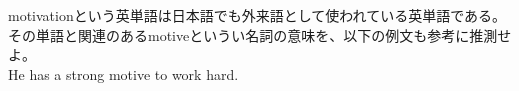 \documentclass{jarticle}
\begin{document}
\vspace*{\fill}
\begin{center}
motivationという英単語は日本語でも外来語として使われている英単語である。\\
その単語と関連のあるmotiveというい名詞の意味を、以下の例文も参考に推測せよ。\\
He has a strong motive to work hard.
\end{center}
\vspace*{\fill}
\end{document}
